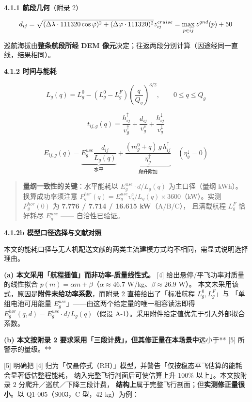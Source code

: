 \documentclass[
  10.5pt,
]{extarticle}
\begin{document}
\textbf{4.1.1 航段几何}（附录 2）

\[d_{ij} = \sqrt{(\Delta\lambda\cdot 111320\cos\bar\varphi)^2+(\Delta\varphi\cdot 111320)^2}\\
z^{cruise}_{ij} = \max_{p\in\overline{ij}} z^{gnd}(p)+50
\]

巡航海拔由\textbf{整条航段所经 DEM
像元}决定；往返两段分别计算（因途经同一直线，结果相同）。

\textbf{4.1.2 时间与能耗}

\[L_g(q)=L^0_g-(L^0_g-L^F_g)\left(\frac{q}{Q_g}\right)^{3/2},\qquad 0\le q\le Q_g\]

\[t_{ij,g}(q)=\frac{h^\uparrow_{ij}}{v^\uparrow_g}+\frac{d_{ij}}{v^c_g}+\frac{h^\downarrow_{ij}}{v^\downarrow_g}\]

\[E_{ij,g}(q)=\underbrace{E^{use}_g\frac{d_{ij}}{L_g(q)}}_{\text{水平}}+\underbrace{\frac{(m^0_g+q)\,g\,h^\uparrow_{ij}}{\eta^\uparrow_g}}_{\text{爬升附加}}\quad(\eta^\downarrow_g=0)\]

\begin{quote}
\textbf{量纲一致性的关键}：水平能耗以 \(E^{use}_g\cdot d/L_g(q)\)
为主口径（量纲 kWh）。换算成功率须注意
\(P^{hor}_g(q)=E^{use}_g v^c_g/L_g(q)\times 3600\)（kW）。实测
\(P^{hor}_g(0)\) 为 \textbf{7.776 / 7.714 / 16.615 kW}（A/B/C），
且满载航程 \(L^F_g\) 恰好耗尽 \(E^{use}_g\) ------ 自洽性已验证。
\end{quote}

\textbf{4.1.2b 模型口径选择与文献对照}

本文的能耗口径与无人机配送文献的两类主流建模方式均不相同，需显式说明选择理由。

\textbf{(a) 本文采用「航程插值」而非功率-质量线性式。} {[}4{]}
给出悬停/平飞功率对质量的线性拟合
\(p(m)=\alpha m+\beta\)（\(\alpha\approx46.7\)
W/kg、\(\beta\approx26.9\) W）。
本文未采用该式，原因是\textbf{附件未给功率系数}，而附录 2
直接给出了「标准航程 \(L^0_g,L^F_g\)」与 「单组电池可用能量
\(E^{use}_g\)」------由这两个给定量的唯一相容读法即得
\(E^{hor}_g(q,d)=E^{use}_g\cdot d/L_g(q)\)（假设
A-1）。采用附件给定值优先于引入外部拟合系数。

\textbf{(b) 本文按附录 2
要求采用「三段计费」，但其修正量在本场景中}远小于** {[}5{]}
所警示的量级。**

{[}5{]} 明确把 {[}4{]}
归为「仅悬停式（RH）」模型，并警告「仅按稳态平飞估算的能耗会显著低估整程能耗，
纳入完整飞行剖面后可使估算上升 100\% 以上」。本文按附录 2
分爬升／巡航／下降三段计费，
\textbf{结构上}属于完整飞行剖面；但\textbf{实测修正量很小}。以
Q1-005（S003，C 型，42 kg）为例：
\end{document}
